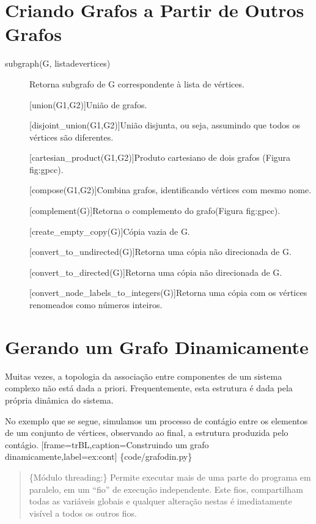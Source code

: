 \documentclass[a4paper,10pt,brazil]{sphinxmanual}
\begin{document}
\section{Criando Grafos a Partir de Outros Grafos}
\label{capgraph:criando-grafos-a-partir-de-outros-grafos}\begin{description}
\item[{subgraph(G, listadevertices)}] \leavevmode
Retorna subgrafo de G correspondente à lista de vértices.

{[}union(G1,G2){]}União de grafos.

{[}disjoint\_union(G1,G2){]}União disjunta, ou seja, assumindo que
todos os vértices são diferentes.

{[}cartesian\_product(G1,G2){]}Produto cartesiano de dois grafos
(Figura fig:gpcc).

{[}compose(G1,G2){]}Combina grafos, identificando vértices com mesmo
nome.

{[}complement(G){]}Retorna o complemento do grafo(Figura fig:gpcc).

{[}create\_empty\_copy(G){]}Cópia vazia de G.

{[}convert\_to\_undirected(G){]}Retorna uma cópia não direcionada de
G.

{[}convert\_to\_directed(G){]}Retorna uma cópia não direcionada de G.

{[}convert\_node\_labels\_to\_integers(G){]}Retorna uma cópia com os
vértices renomeados como números inteiros.

\end{description}


\section{Gerando um Grafo Dinamicamente}
\label{capgraph:gerando-um-grafo-dinamicamente}
Muitas vezes, a topologia da associação entre componentes de um
sistema complexo não está dada a priori. Frequentemente, esta
estrutura é dada pela própria dinâmica do sistema.

No exemplo que se segue, simulamos um processo de contágio entre os
elementos de um conjunto de vértices, observando ao final, a
estrutura produzida pelo contágio.
{[}frame=trBL,caption=Construindo um grafo dinamicamente,label=ex:cont{]} \{code/grafodin.py\}
\begin{quote}

\{Módulo threading:\} Permite executar mais de uma parte do programa
em paralelo, em um ``fio'' de execução independente. Este fios,
compartilham todas as variáveis globais e qualquer alteração nestas
é imediatamente visível a todos os outros fios.
\end{quote}
\end{document}

